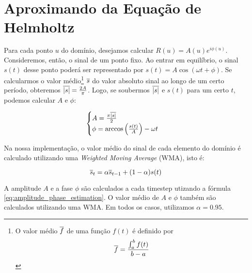 \section {Aproximando da Equação de Helmholtz}

Para cada ponto $u$ do domínio, desejamos calcular $R(u) = A(u)e^{i\phi(u)}$. Consideremos, então, o sinal de um ponto fixo. Ao entrar em equilíbrio, o sinal $s(t)$ desse ponto poderá ser representado por $s(t) = A \cos(\omega t + \phi)$. Se calcularmos o valor médio\footnote{O valor médio $\overline{f}$ de uma função $f(t)$ é definido por $$\overline{f} = \frac{\int_a^b f(t)}{b-a}$$} $\overline{s}$ do valor absoluto sinal ao longo de um certo período, obteremos $\overline{|s|} = \frac{2A}{\pi}$. Logo, se soubermos $\overline{|s|}$ e $s(t)$ para um certo $t$, podemos calcular $A$ e $\phi$: 

\begin{equation}
	\begin{cases}
		A = \frac{\pi\overline{|s|}}{2}\\
		\phi = \arccos \left(\frac{s(t)}{A}\right) - \omega t
	\end{cases}
	\label{eq:amplitude_phase_estimation}
\end{equation}

Na nossa implementação, o valor médio do sinal de cada elemento do domínio é calculado utilizando uma \emph{Weighted Moving Average} (WMA), isto é:

\begin{equation}
	\overline{s}_{t} = \alpha\overline{s}_{t-1} + (1-\alpha)s(t)
\end{equation}

A amplitude $A$ e a fase $\phi$ são calculados a cada timestep utizando a fórmula \eqref{eq:amplitude_phase_estimation}. O valor médio de $A$ e $\phi$ também são calculados utilizando uma WMA. Em todos os casos, utilizamos $\alpha = 0.95$.